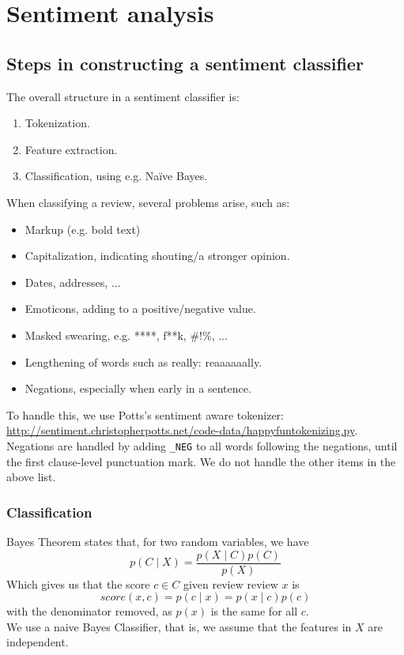 \section{Sentiment analysis}

\subsection{Steps in constructing a sentiment classifier}
The overall structure in a sentiment classifier is:
\begin{enumerate}
    \item Tokenization.
    \item Feature extraction.
    \item Classification, using e.g. Naïve Bayes.
\end{enumerate}
%
When classifying a review, several problems arise, such as:
\begin{itemize}
    \item Markup (e.g. bold text)
    \item Capitalization, indicating shouting/a stronger opinion.
    \item Dates, addresses, ...
    \item Emoticons, adding to a positive/negative value.
    \item Masked swearing, e.g. ****, f**k, \@\#!\%, ...
    \item Lengthening of words such as really: reaaaaaally.
    \item Negations, especially when early in a sentence.
\end{itemize}

To handle this, we use Potts's sentiment aware tokenizer: \url{http://sentiment.christopherpotts.net/code-data/happyfuntokenizing.py}. Negations are handled by adding \texttt{\_NEG} to all words following the negations, until the first clause-level punctuation mark. We do not handle the other items in the above list.

\subsubsection{Classification}
Bayes Theorem states that, for two random variables, we have
\[
    p(C \mid X) = \frac{p(X \mid C) p(C)}{p(X)}
\]
Which gives us that the score $c \in C$ given review review $x$ is
\[
    score(x, c) = p(c \mid x) = p(x \mid c)p(c)
\]
with the denominator removed, as $p(x)$ is the same for all $c$.
\\
We use a naive Bayes Classifier, that is, we assume that the features in $X$ are independent.

